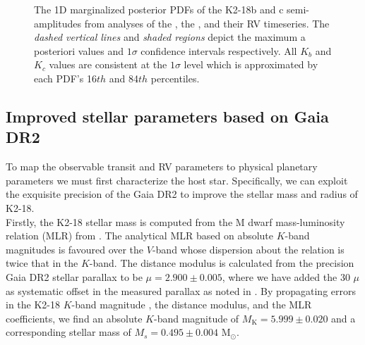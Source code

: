 \begin{figure}
  \caption[Marginalized posterior PDFs of $K_b$ and $K_c$ with HARPS and CARMENES.]
    {\small The 1D marginalized posterior PDFs of the K2-18b and c semi-amplitudes from analyses
    of the
    , the
    , and their
     RV timeseries. The
    \emph{dashed vertical lines} and \emph{shaded regions} depict the maximum a posteriori values
    and $1\sigma$ confidence intervals respectively. 
    All $K_b$ and $K_c$ values are consistent at the $1\sigma$ level which is approximated by each
    PDF's 16${th}$ and 84${th}$ percentiles.}
  \label{k2182fig:postK}
\end{figure}


\subsection{Improved stellar parameters based on Gaia DR2}
To map the observable transit and RV parameters to physical planetary parameters we must first characterize the
host star. Specifically, we can exploit the exquisite precision of the Gaia DR2 to improve the stellar mass and
radius of K2-18. \\

Firstly, the K2-18 stellar mass is computed from the M dwarf mass-luminosity relation (MLR) from \cite{benedict16}.
The analytical MLR based on absolute $K$-band magnitudes is favoured over the $V$-band whose dispersion about the
relation is twice that in the $K$-band. The distance modulus is calculated from the precision Gaia DR2 stellar parallax
\citep[$p=26.299\pm 0.055$ mas;][]{gaia18} to be $\mu=2.900\pm 0.005$, where we have added the 30 $\mu$as systematic
offset in the measured parallax as noted in \cite{lindegren18}. By propagating errors
in the K2-18 $K$-band magnitude \citep[$K=8.899\pm 0.019$;][]{cutri03}, the distance modulus, and the MLR coefficients,
we find an absolute $K$-band
magnitude of $M_{\text{K}}=5.999\pm 0.020$ and a corresponding stellar mass of $M_s=0.495\pm 0.004$ M$_{\odot}$. \\

